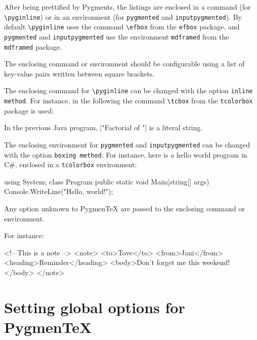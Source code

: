 \documentclass[10pt,a4paper]{article}
\begin{document}
After being prettified by Pygments, the listings are enclosed in a
command (for \verb|\pyginline|) or in an environment (for
\verb|pygmented| and \verb|inputpygmented|). By default
\verb|\pyginline| uses the command \verb|\efbox| from the \texttt{efbox}
package, and \verb|pygmented| and \verb|inputpygmented| use the
environment \verb|mdframed| from the \texttt{mdframed} package.

The enclosing command or environment should be configurable using a list
of key-value pairs written between square brackets.

The enclosing command for
\verb|\pyginline| can be changed with the option
\verb|inline method|. For instance, in the following the command
\verb|\tcbox| from the \verb|tcolorbox| package is used:

\begin{Example}
  In the previous Java program,
  \pyginline[lang=java,inline method=tcbox]|"Factorial of "| is a
  literal string.
\end{Example}

The enclosing environment for \verb|pygmented| and
\verb|inputpygmented| can be changed with the option
\verb|boxing method|. For instance, here is a hello world program in
C\#, enclosed in a \verb|tcolorbox| environment:

\begin{Example}
\begin{pygmented}[lang=csharp,boxing method=tcolorbox]
using System;
class Program
{
    public static void Main(string[] args)
    {
        Console.WriteLine("Hello, world!");
    }
}
\end{pygmented}
\end{Example}

Any option unknown to Pygmen\TeX{} are passed to the enclosing command
or environment.

For instance:

\begin{Example}
\begin{pygmented}[lang=xml,boxing method=tcolorbox,colframe=red,boxrule=2mm]
<!-- This is a note -->
<note>
   <to>Tove</to>
   <from>Jani</from>
   <heading>Reminder</heading>
   <body>Don't forget me this weekend!</body>
</note>
\end{pygmented}
\end{Example}

\section{Setting global options for Pygmen\TeX{}}
\end{document}
